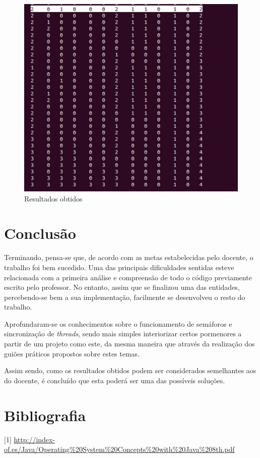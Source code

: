 \documentclass[10pt,portuguese]{article}
\begin{document}
\begin{figure}[!tH]
    \centering
    \includegraphics[scale=0.5]{images/resultados/res2.png}
    \caption{Resultados obtidos}
    \vspace*{10in} %
\end{figure}


\clearpage

\section{Conclusão}
\par Terminando, pensa-se que, de acordo com as metas estabelecidas pelo docente, o trabalho foi bem sucedido. Uma das principais dificuldades sentidas esteve relacionada com a primeira análise e compreensão de todo o código previamente escrito pelo professor. No entanto, assim que se finalizou uma das entidades, percebendo-se bem a sua implementação, facilmente se desenvolveu o resto do trabalho.
\par Aprofundaram-se os conhecimentos sobre o funcionamento de semáforos e sincronização de \textit{threads}, sendo mais simples interiorizar certos pormenores a partir de um projeto como este, da mesma maneira que através da realização dos guiões práticos propostos sobre estes temas.
\par Assim sendo, como os resultados obtidos podem ser considerados semelhantes aos do docente, é concluído que esta poderá ser uma das possíveis soluções.

\clearpage

\section{Bibliografia}





\vspace{5mm} %

[1] \url{http://index-of.es/Java/Operating%20System%20Concepts%20with%20Java%208th.pdf}
\end{document}
